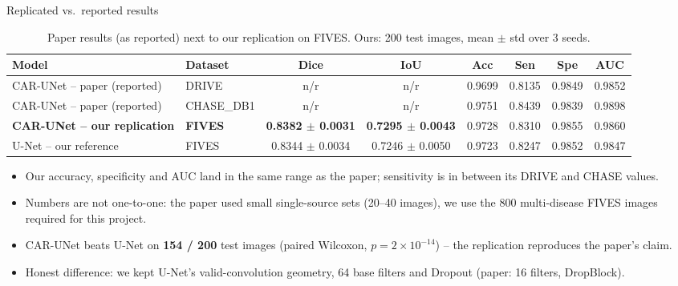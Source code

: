 \documentclass[aspectratio=169,10pt]{beamer}
\begin{document}
\begin{frame}{Replicated vs.\ reported results}
  \begin{table}
    \caption{Paper results (as reported) next to our replication on FIVES. Ours: 200 test images, mean $\pm$ std over 3 seeds.}
    \scriptsize
    \begin{tabular}{@{}llcccccc@{}}
      \toprule
      Model & Dataset & \textbf{Dice} & \textbf{IoU} & Acc & Sen & Spe & AUC \\
      \midrule
      CAR-UNet -- paper (reported) & DRIVE & n/r & n/r & 0.9699 & 0.8135 & 0.9849 & 0.9852 \\
      CAR-UNet -- paper (reported) & CHASE\_DB1 & n/r & n/r & 0.9751 & 0.8439 & 0.9839 & 0.9898 \\
      \rowcolor{navy!8}
      \textbf{CAR-UNet -- our replication} & \textbf{FIVES} & \textbf{0.8382 $\pm$ 0.0031} & \textbf{0.7295 $\pm$ 0.0043} & 0.9728 & 0.8310 & 0.9855 & 0.9860 \\
      U-Net -- our reference & FIVES & 0.8344 $\pm$ 0.0034 & 0.7246 $\pm$ 0.0050 & 0.9723 & 0.8247 & 0.9852 & 0.9847 \\
      \bottomrule
    \end{tabular}
  \end{table}
  \begin{itemize}\setlength\itemsep{3pt}\small
    \item Our accuracy, specificity and AUC land in the same range as the paper; sensitivity is in between its DRIVE and CHASE values.
    \item Numbers are not one-to-one: the paper used small single-source sets (20--40 images), we use the 800 multi-disease FIVES images required for this project.
    \item CAR-UNet beats U-Net on \textbf{154 / 200} test images (paired Wilcoxon, $p = 2\times10^{-14}$) -- the replication reproduces the paper's claim.
    \item Honest difference: we kept U-Net's valid-convolution geometry, 64 base filters and Dropout (paper: 16 filters, DropBlock).
  \end{itemize}
\end{frame}
\end{document}
